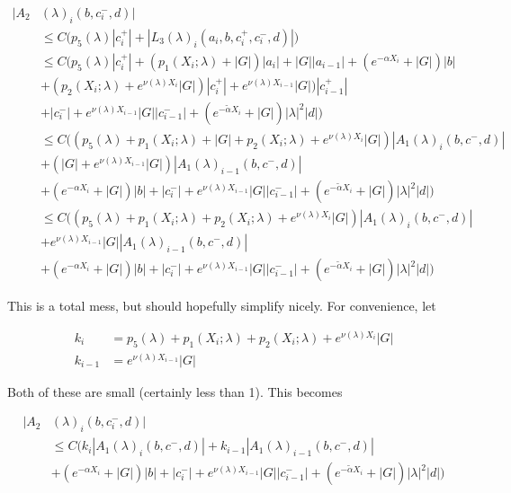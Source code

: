 \documentclass[12pt]{article}
\begin{document}
\begin{enumerate}
\begin{align*}
|A_2&(\lambda)_i(b, c_i^-, d)| \\
&\leq C \Big( p_5(\lambda)|c_i^+| + |L_3(\lambda)_i(a_i, b, c_i^+, c_i^-, d)| \Big)\\
&\leq C \Big( p_5(\lambda)|c_i^+| + (p_1(X_i; \lambda) + |G|)|a_i| + |G||a_{i-1}| + (e^{-\alpha X_i} + |G|) |b| \\
&+ ( p_2(X_i; \lambda) + e^{\nu(\lambda)X_i} |G|) |c_i^+| + e^{\nu(\lambda)X_{i-1}} |G|) |c_{i-1}^+| \\
&+ |c_i^-| + e^{\nu(\lambda)X_{i-1}} |G||c_{i-1}^-| + (e^{-\tilde{\alpha} X_i} + |G|) |\lambda|^2 |d| \Big) \\
&\leq C \Big( (p_5(\lambda) + p_1(X_i; \lambda) + |G| + p_2(X_i; \lambda) + e^{\nu(\lambda)X_i} |G|) |A_1(\lambda)_i(b, c^-, d)|  \\
&+ (|G| + e^{\nu(\lambda)X_{i-1}} |G|)|A_1(\lambda)_{i-1}(b, c^-, d)|  \\
&+ (e^{-\alpha X_i} + |G|) |b| + |c_i^-| + e^{\nu(\lambda)X_{i-1}} |G||c_{i-1}^-| 
+ (e^{-\tilde{\alpha} X_i} + |G|) |\lambda|^2 |d| \Big) \\
&\leq C \Big( (p_5(\lambda) + p_1(X_i; \lambda) + p_2(X_i; \lambda) + e^{\nu(\lambda)X_i} |G|) |A_1(\lambda)_i(b, c^-, d)|  \\
&+ e^{\nu(\lambda)X_{i-1}} |G||A_1(\lambda)_{i-1}(b, c^-, d)|  \\
&+ (e^{-\alpha X_i} + |G|) |b| + |c_i^-| + e^{\nu(\lambda)X_{i-1}} |G||c_{i-1}^-| 
+ (e^{-\tilde{\alpha} X_i} + |G|) |\lambda|^2 |d| \Big)
\end{align*} 

This is a total mess, but should hopefully simplify nicely. For convenience, let

\begin{align*}
k_i &= p_5(\lambda) + p_1(X_i; \lambda) + p_2(X_i; \lambda) + e^{\nu(\lambda)X_i} |G|\\
k_{i-1} &= e^{\nu(\lambda)X_{i-1}} |G|
\end{align*}

Both of these are small (certainly less than 1). This becomes

\begin{align*}
|A_2&(\lambda)_i(b, c_i^-, d)| \\
&\leq C \Big( k_i |A_1(\lambda)_i(b, c^-, d)| + k_{i-1} |A_1(\lambda)_{i-1}(b, c^-, d)|  \\
&+ (e^{-\alpha X_i} + |G|) |b| + |c_i^-| + e^{\nu(\lambda)X_{i-1}} |G||c_{i-1}^-| 
+ (e^{-\tilde{\alpha} X_i} + |G|) |\lambda|^2 |d| \Big)
\end{align*} 


\end{enumerate}
\end{document}
